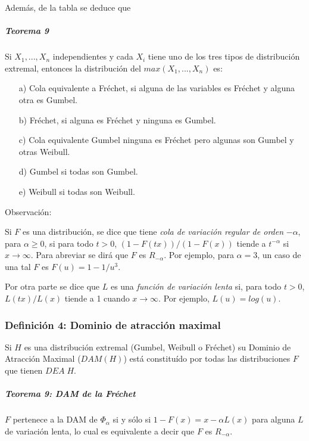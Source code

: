 \documentclass[
  12pt]{article}
\begin{document}
Además, de la tabla se deduce que

\hypertarget{teorema-9}{%
\subparagraph{Teorema 9}\label{teorema-9}}

Si \(X_1,...,X_n\) independientes y cada \(X_i\) tiene uno de los tres
tipos de distribución extremal, entonces la distribución del
\(max(X_1,...,X_n)\) es:

\begin{itemize}
\item[a)] Cola equivalente a Fréchet, si alguna de las variables es Fréchet y alguna otra es Gumbel.
\item[b)]  Fréchet, si alguna es Fréchet y ninguna es Gumbel.
\item[c)]  Cola equivalente Gumbel ninguna es Fréchet pero algunas son Gumbel y otras Weibull.
\item[d)] Gumbel si todas son Gumbel.
\item[e)]  Weibull si todas son Weibull.
\end{itemize}

Observación:

Si \(F\) es una distribución, se dice que tiene
\textit{cola de variación regular de orden} \(-\alpha\), para
\(\alpha \geq 0\), si para todo \(t>0\), \((1-F(tx))/(1-F(x))\) tiende a
\(t^{-\alpha}\) si \(x \rightarrow \infty\). Para abreviar se dirá que
\(F\) es \(R_{-\alpha}\). Por ejemplo, para \(\alpha=3\), un caso de una
tal \(F\) es \(F(u)=1- 1/u^3\).

Por otra parte se dice que \(L\) es una
\textit{función de variación lenta} si, para todo \(t>0\),
\(L(tx)/L(x)\) tiende a 1 cuando \(x \rightarrow \infty\). Por ejemplo,
\(L(u)=log(u)\).

\newpage

\hypertarget{definiciuxf3n-4-dominio-de-atracciuxf3n-maximal}{%
\subsubsection{Definición 4: Dominio de atracción
maximal}\label{definiciuxf3n-4-dominio-de-atracciuxf3n-maximal}}

Si \(H\) es una distribución extremal (Gumbel, Weibull o Fréchet) su
Dominio de Atracción Maximal (\(DAM(H)\)) está constituído por todas las
distribuciones \(F\) que tienen \(DEA\;H\).

\hypertarget{teorema-9-dam-de-la-fruxe9chet}{%
\subparagraph{Teorema 9: DAM de la
Fréchet}\label{teorema-9-dam-de-la-fruxe9chet}}

\(F\) pertenece a la DAM de \(\Phi_{\alpha}\) si y sólo si
\(1-F(x)=x-\alpha L(x)\) para alguna \(L\) de variación lenta, lo cual
es equivalente a decir que \(F\) es \(R_{-\alpha}\).
\end{document}
